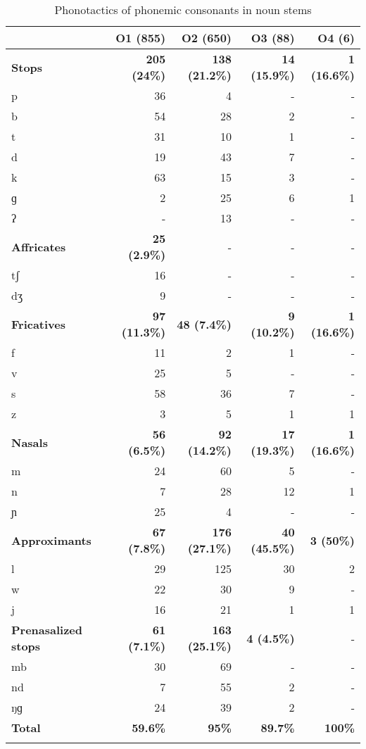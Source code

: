 \begin{table}
\begin{tabularx}{\textwidth}{X rrrr}
 \lsptoprule
 & O1 (855) & O2 (650) &  O3 (88)   & O4 (6) \\  \midrule
{\bfseries Stops}  & {\bfseries 205 (24\%)} & {\bfseries 138 (21.2\%)}  & {\bfseries 14 (15.9\%)} &   {\bfseries 1 (16.6\%)}  \\ 
        p &  36  & 4  &  -  & - \\ 
         b  &  54   &  28  &  2  & - \\
          t  &   31  &  10  &  1 &  - \\
        d   &   19 &   43 &  7  & - \\
         k  &   63  &   15  & 3  & - \\
          ɡ &   2  &  25  & 6 & 1 \\
         ʔ &   -   & 13   & -  & - \\  \midrule
{\bfseries Affricates}  & {\bfseries 25 (2.9\%)}  & - & - & - \\ 
	tʃ &  16   &  -  & - &  -\\
	dʒ &  9  &  -  & -   & - \\   \midrule
{\bfseries Fricatives}  & {\bfseries 97 (11.3\%)} & {\bfseries 48 (7.4\%)} & {\bfseries 9 (10.2\%)} &  {\bfseries 1 (16.6\%)}  \\
           f& 11 &  2  & 1 & - \\ 
           v &  25   &  5  & -  & - \\ 
          s  &  58    &  36  & 7  & - \\
         z  &  3   &  5  & 1  &  1 \\  \midrule
{\bfseries Nasals}  & {\bfseries 56 (6.5\%)} & {\bfseries 92 (14.2\%)}  & {\bfseries 17 (19.3\%)}  &  {\bfseries 1 (16.6\%)}  \\
         m & 24     &  60   & 5 & - \\ 
         n  &   7   &   28  & 12  & 1 \\
         ɲ  &  25    & 4   & - & -  \\  \midrule
{\bfseries Approximants}  & {\bfseries 67 (7.8\%)} & {\bfseries 176 (27.1\%)}  & {\bfseries 40 (45.5\%)} &  {\bfseries 3 (50\%)}  \\
           l &   29  &  125  &  30 &  2 \\
           w &   22  &   30  &  9 &  - \\
           j  &  16   &  21  & 1  & 1 \\  \midrule
{\bfseries Prenasalized stops}  & {\bfseries 61 (7.1\%)}   & {\bfseries 163 (25.1\%)} & {\bfseries 4 (4.5\%)} & - \\
	mb    & 30 & 69 & - & - \\
	nd     & 7 & 55 & 2 & - \\
	ŋɡ	& 24  & 39 & 2 & - \\  \midrule
{\bfseries Total} & {\bfseries 59.6\%} & {\bfseries 95\%} & {\bfseries 89.7\%} & {\bfseries 100\%}   \\
\lspbottomrule
\end{tabularx}
\caption{Phonotactics of phonemic consonants in noun stems}
\label{Tab:PhonotactN}
\end{table}

